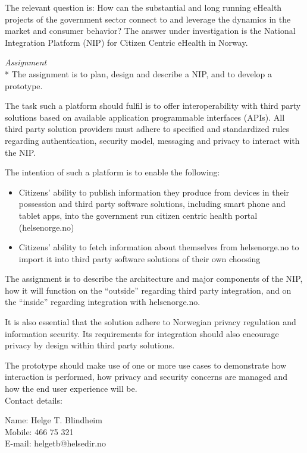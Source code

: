 The relevant question is: How can the substantial and long running eHealth projects of the government sector connect to and leverage the dynamics in the market and consumer behavior? 
The answer under investigation is the National Integration Platform (NIP) for Citizen Centric eHealth in Norway. 

\textit{Assignment} \\* 
The assignment is to plan, design and describe a NIP, and to develop a prototype.

The task such a platform should fulfil is to offer interoperability with third party solutions based on available application programmable interfaces (APIs).
All third party solution providers must adhere to specified and standardized rules regarding authentication, security model, messaging and privacy to interact with the NIP. 

The intention of such a platform is to enable the following:
\begin{itemize}
\item Citizens’ ability to publish information they produce from devices in their possession and third party software solutions, including smart phone and tablet apps, into the government run citizen centric health portal (helsenorge.no)
\item Citizens’ ability to fetch information about themselves from helsenorge.no to import it into third party software solutions of their own choosing
\end{itemize}

The assignment is to describe the architecture and major components of the NIP, how it will function on the “outside” regarding third party integration, and on the “inside” regarding integration with helsenorge.no.

It is also essential that the solution adhere to Norwegian privacy regulation and information security. 
Its requirements for integration should also encourage privacy by design within third party solutions.

The prototype should make use of one or more use cases to demonstrate how interaction is performed, how privacy and security concerns are managed and how the end user experience will be. \\


Contact details: 

Name:		Helge T. Blindheim\\
Mobile:		466 75 321\\
E-mail:		helgetb@helsedir.no

